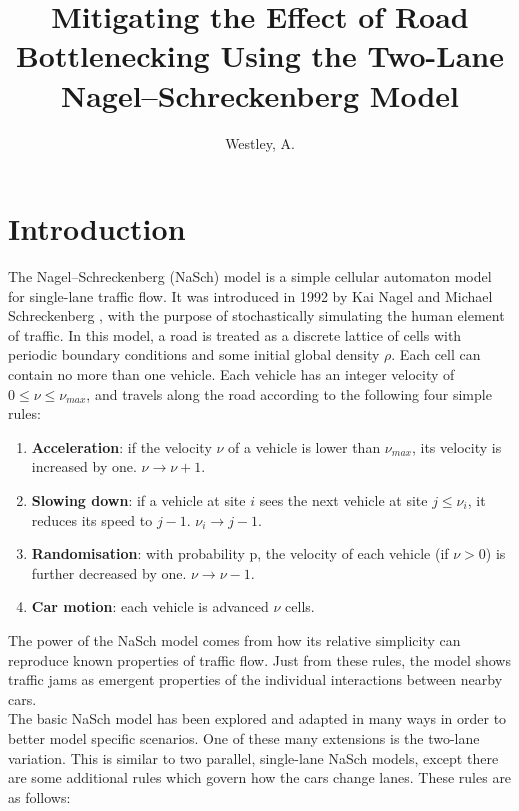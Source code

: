 \documentclass[11pt]{article}
\title{Mitigating the Effect of Road Bottlenecking Using the Two-Lane Nagel--Schreckenberg Model}
\author{Westley, A.}
\begin{document}
	
	\maketitle 
	
	\hfill \break
	
	\section{Introduction} \label{sec:intro}
	
	The Nagel--Schreckenberg (NaSch) model is a simple cellular automaton model for single-lane traffic flow. It was introduced in 1992 by Kai Nagel and Michael Schreckenberg \cite{nagel1992cellular}, with the purpose of stochastically simulating the human element of traffic. In this model, a road is treated as a discrete lattice of cells with periodic boundary conditions and some initial global density $\rho$. Each cell can contain no more than one vehicle. Each vehicle has an integer velocity of $0 \leq \nu \leq \nu_{max}$, and travels along the road according to the following four simple rules: 
	
	\begin{enumerate}
		\item \textbf{Acceleration}: if the velocity $\nu$ of a vehicle is lower than $\nu_{max}$, its velocity is increased by one. $\nu \rightarrow \nu + 1$.
		\item \textbf{Slowing down}: if a vehicle at site $i$ sees the next vehicle at site $j \leq \nu_i$, it reduces its speed to $j-1$. $\nu_i \rightarrow j-1$.
		\item \textbf{Randomisation}: with probability p, the velocity of each vehicle (if $\nu > 0$) is further decreased by one. $\nu \rightarrow \nu - 1$.
		\item \textbf{Car motion}: each vehicle is advanced $\nu$ cells.
	\end{enumerate}
	
	The power of the NaSch model comes from how its relative simplicity can reproduce known properties of traffic flow. Just from these rules, the model shows traffic jams as emergent properties of the individual interactions between nearby cars. \\
	
	The basic NaSch model has been explored and adapted in many ways in order to better model specific scenarios. One of these many extensions is the two-lane variation. This is similar to two parallel, single-lane NaSch models, except there are some additional rules which govern how the cars change lanes\cite{wright2013flow}. These rules are as follows:
	
\end{document}
